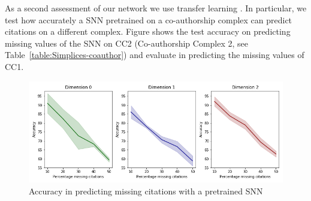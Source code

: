 As a second assessment of our network we use transfer learning . In particular, we test how accurately a SNN pretrained on a co-authorship complex can predict citations on a different complex. Figure shows the test accuracy on predicting missing values of the SNN on CC2 (Co-authorship Complex 2, see Table~\ref{table:Simplices-coauthor}) and evaluate in predicting the missing values of CC1.



\begin{figure}[htbp]
  \centering
 
\includegraphics[scale=0.4]{./figures/accuracy_network1_pretrained.png}
  \caption{Accuracy in predicting missing citations with a pretrained SNN }
\end{figure}

